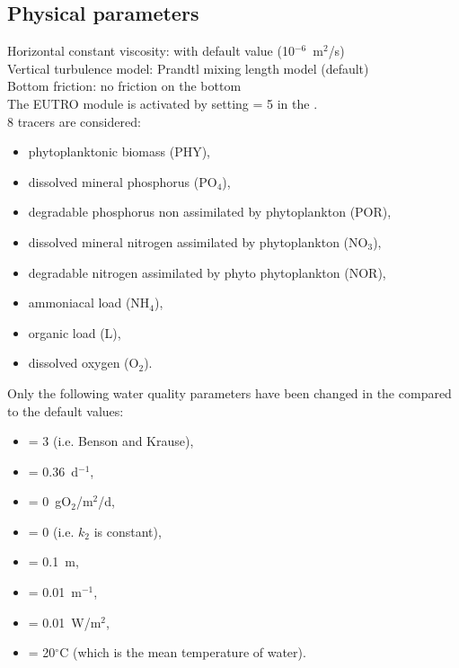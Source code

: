 \subsection{Physical parameters}

Horizontal constant viscosity: with default value (10$^{-6}$~m$^2$/s)\\
Vertical turbulence model: Prandtl mixing length model (default)\\
Bottom friction: no friction on the bottom\\

The EUTRO module is activated by setting  = 5
in the  .\\

8 tracers are considered:
\begin{itemize}
\item phytoplanktonic biomass (PHY),
\item dissolved mineral phosphorus (PO$_4$),
\item degradable phosphorus non assimilated by phytoplankton (POR),
\item dissolved mineral nitrogen assimilated by phytoplankton (NO$_3$),
\item degradable nitrogen assimilated by phyto phytoplankton (NOR),
\item ammoniacal load (NH$_4$),
\item organic load (L),
\item dissolved oxygen (O$_2$).
\end{itemize}

Only the following water quality parameters have been changed
in the \waqtel {} compared to the default values:
\begin{itemize}
\item {} = 3 (i.e. Benson and Krause),
\item {} = 0.36~d$^{-1}$,
\item {} = 0~gO$_2$/m$^2$/d,
\item {} = 0 (i.e. $k_2$ is constant),
\item {} = 0.1~m,
\item {} = 0.01~m$^{-1}$,
\item {} = 0.01~W/m$^2$,
\item {} = 20$^\circ$C (which is the mean temperature of water).
\end{itemize}

